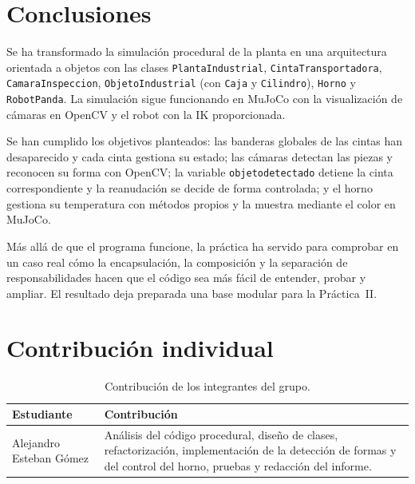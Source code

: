 \documentclass[12pt,a4paper]{article}
\newcommand{\nombrealumno}{Alejandro Esteban Gómez}
\renewcommand{\_}{\guionbajo\allowbreak}
\begin{document}

\section{Conclusiones}

Se ha transformado la simulación procedural de la planta en una arquitectura orientada a
objetos con las clases \texttt{PlantaIndustrial}, \texttt{CintaTransportadora},
\texttt{CamaraInspeccion}, \texttt{ObjetoIndustrial} (con \texttt{Caja} y
\texttt{Cilindro}), \texttt{Horno} y \texttt{RobotPanda}. La simulación sigue
funcionando en MuJoCo con la visualización de cámaras en OpenCV y el robot con la IK
proporcionada.

Se han cumplido los objetivos planteados: las banderas globales de las cintas han
desaparecido y cada cinta gestiona su estado; las cámaras detectan las piezas y
reconocen su forma con OpenCV; la variable \texttt{objeto\_detectado} detiene la cinta
correspondiente y la reanudación se decide de forma controlada; y el horno gestiona su
temperatura con métodos propios y la muestra mediante el color en MuJoCo.

Más allá de que el programa funcione, la práctica ha servido para comprobar en un caso
real cómo la encapsulación, la composición y la separación de responsabilidades hacen que
el código sea más fácil de entender, probar y ampliar. El resultado deja preparada una
base modular para la Práctica~II.


\section{Contribución individual}

\begin{table}[H]
    \centering
    \caption{Contribución de los integrantes del grupo.}
    \begin{tabularx}{\textwidth}{>{\raggedright\arraybackslash}p{4cm}X}
        \toprule
        \textbf{Estudiante} & \textbf{Contribución} \\
        \midrule
        \nombrealumno & Análisis del código procedural, diseño de clases, refactorización, implementación de la detección de formas y del control del horno, pruebas y redacción del informe. \\
        \bottomrule
    \end{tabularx}
\end{table}
\end{document}
